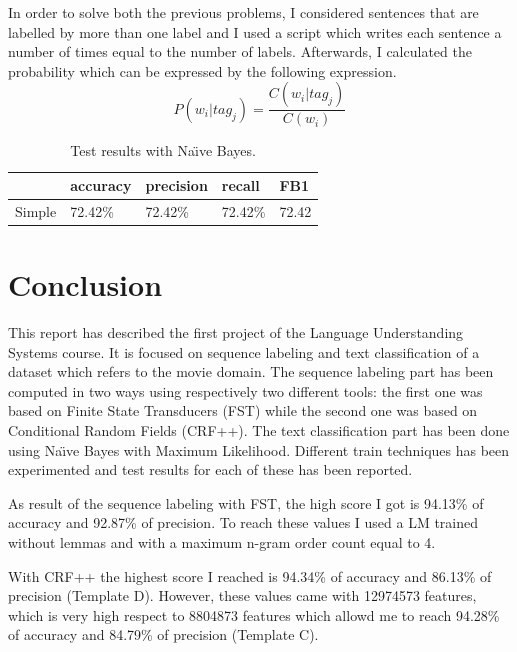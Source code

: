 \documentclass[a4paper,7pt,oneside]{book}
\newcommand\chap[1]{\chapter*{#1}\addcontentsline{toc}{chapter}{\protect\numberline{}#1}}
\begin{document}
\noindent
In order to solve both the previous problems, I considered sentences that are labelled by more than one label and I used a script which writes each sentence a number of times equal to the number of labels. Afterwards, I calculated the probability which can be expressed by the following expression.
\[ P(w_i | tag_j) = \frac{C(w_i | tag_j)}{C(w_i)} \]

\begin{table}[h!]
\small
	\begin{center}
	\begin{tabular}{|l|l|l|l|l|}
		\cline{2-5}
		\multicolumn{1}{r|}{} & accuracy & precision & recall & FB1 \\ \hline
		Simple & 72.42\% & 72.42\% & 72.42\% & 72.42 \\ \hline
	\end{tabular}
	\caption{Test results with Na\"{\i}ve Bayes.}
	\label{table:bayes_results}
	\end{center}
\end{table}



\chap{Conclusion}

This report has described the first project of the Language Understanding Systems course. It is focused on sequence labeling and text classification of a dataset which refers to the movie domain. The sequence labeling part has been computed in two ways using respectively two different tools: the first one was based on Finite State Transducers (FST) while the second one was based on Conditional Random Fields (CRF++). The text classification part has been done using Na\"{\i}ve Bayes with Maximum Likelihood. Different train techniques has been experimented and test results for each of these has been reported.

As result of the sequence labeling with FST, the high score I got is 94.13\% of accuracy and 92.87\% of precision. To reach these values I used a LM trained without lemmas and with a maximum n-gram order count equal to 4.

With CRF++ the highest score I reached is 94.34\% of accuracy and 86.13\% of precision (Template D). However, these values came with 12974573 features, which is very high respect to 8804873 features which allowd me to reach 94.28\% of accuracy and 84.79\% of precision (Template C).
\end{document}

